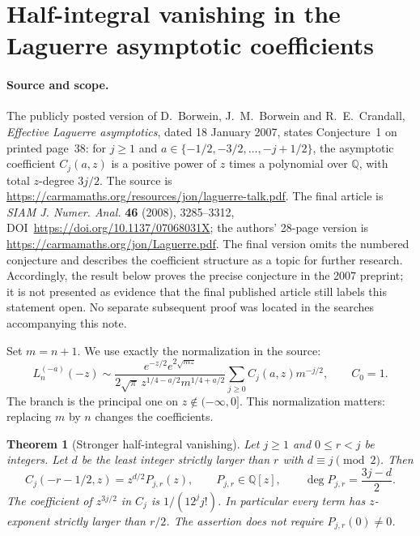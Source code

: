\documentclass[11pt,a4paper]{article}
\newtheorem{theorem}{Theorem}[section]
\theoremstyle{definition}
\theoremstyle{remark}
\numberwithin{equation}{section}
\begin{document}
\section{Half-integral vanishing in the Laguerre asymptotic coefficients}
\label{p8:sec:bbc-laguerre}

\paragraph{Source and scope.}
The publicly posted version of D.~Borwein, J.~M.~Borwein and
R.~E.~Crandall, \emph{Effective Laguerre asymptotics}, dated
18 January 2007, states Conjecture~1 on printed page~38:
for $j\geq1$ and $a\in\{-1/2,-3/2,\ldots,-j+1/2\}$,
the asymptotic coefficient $C_j(a,z)$ is a positive power of $z$
times a polynomial over $\mathbb Q$, with total $z$-degree $3j/2$.
The source is
\url{https://carmamaths.org/resources/jon/laguerre-talk.pdf}.
The final article is \emph{SIAM J. Numer. Anal.} \textbf{46}
(2008), 3285--3312, DOI~\url{https://doi.org/10.1137/07068031X};
the authors' 28-page version is
\url{https://carmamaths.org/jon/Laguerre.pdf}.
The final version omits the numbered conjecture and describes the
coefficient structure as a topic for further research.
Accordingly, the result below proves the precise conjecture in the
2007 preprint; it is not presented as evidence that the final published
article still labels this statement open.  No separate subsequent proof
was located in the searches accompanying this note.

Set $m=n+1$.  We use exactly the normalization in the source:
\begin{equation}\label{p8:eq:bbc-normalization}
 L_n^{(-a)}(-z)\sim
 \frac{e^{-z/2}e^{2\sqrt{mz}}}
 {2\sqrt\pi\,z^{1/4-a/2}m^{1/4+a/2}}
 \sum_{j\geq0}C_j(a,z)m^{-j/2},\qquad C_0=1.
\end{equation}
The branch is the principal one on $z\notin(-\infty,0]$.
This normalization matters: replacing $m$ by $n$ changes the coefficients.

\begin{theorem}[Stronger half-integral vanishing]
\label{p8:thm:bbc-half-integral}
Let $j\geq1$ and $0\leq r<j$ be integers.  Let $d$ be the least
integer strictly larger than $r$ with $d\equiv j\pmod2$.
Then
\begin{equation}\label{p8:eq:bbc-half-factor}
 C_j(-r-1/2,z)=z^{d/2}P_{j,r}(z),\qquad
 P_{j,r}\in\mathbb Q[z],\qquad
 \deg P_{j,r}=\frac{3j-d}{2}.
\end{equation}
The coefficient of $z^{3j/2}$ in $C_j$ is $1/(12^j j!)$.
In particular every term has $z$-exponent strictly larger than $r/2$.
The assertion does not require $P_{j,r}(0)\ne0$.
\end{theorem}
\end{document}
